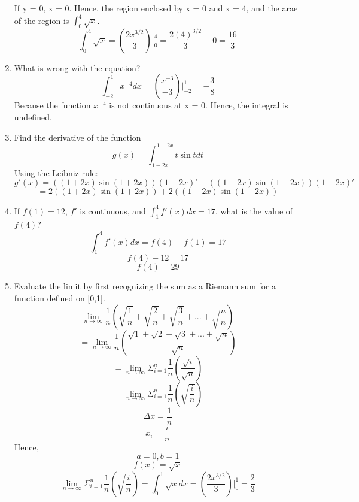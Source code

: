 \documentclass[12pt]{article}
\begin{document}
\begin{enumerate}
\begin{center}
    \end{center}
    If y = 0, x = 0. Hence, the region enclosed by x = 0 and x = 4, and the arae of the region is $\int_{0}^{4} \sqrt{x}$.
    \[\int_{0}^{4} \sqrt{x} = (\frac{2x^{3/2}}{3})|^{4}_{0} = \frac{2(4)^{3/2}}{3} - 0 = \frac{16}{3}\]
\setcounter{enumi}{54}
    \item What is wrong with the equation?
    \[\int_{-2}^{1} x^{-4}dx = (\frac{x^{-3}}{-3})|^{1}_{-2} = -\frac{3}{8} \]
    Because the function $x^{-4}$ is not continuous at x = 0. Hence, the integral is undefined.
\setcounter{enumi}{59}
    \item Find the derivative of the function
    \[g(x) = \int_{1-2x}^{1+2x} t \sin t dt\]
    Using the Leibniz rule:
    \[g'(x) = ((1+2x)\sin (1+2x))(1+2x)' - ((1-2x)\sin (1-2x))(1-2x)' \]
    \[ = 2((1+2x)\sin (1+2x)) + 2((1-2x)\sin (1-2x)) \]
\setcounter{enumi}{66}
    \item If $f(1) = 12$, $f'$ is continuous, and $\int_{1}^{4} f'(x)dx = 17$, what is the value of $f(4)$?
    \[\int_{1}^{4} f'(x)dx = f(4) - f(1) = 17\]
    \[f(4) - 12 = 17\]
    \[f(4) = 29\]
\setcounter{enumi}{73}
    \item Evaluate the limit by first recognizing the sum as a Riemann sum for a function defined on [0,1].
    \[\lim_{n \to \infty} \frac{1}{n} (\sqrt{\frac{1}{n}} + \sqrt{\frac{2}{n}} + \sqrt{\frac{3}{n}} + ... + \sqrt{\frac{n}{n}})\]
    \[ = \lim_{n \to \infty} \frac{1}{n} (\frac{\sqrt{1} + \sqrt{2} + \sqrt{3} + ... + \sqrt{n}}{\sqrt{n}})\]
    \[ = \lim_{n \to \infty} \Sigma^{n}_{i = 1} \frac{1}{n} (\frac{\sqrt{i}}{\sqrt{n}})\]
    \[ = \lim_{n \to \infty} \Sigma^{n}_{i = 1} \frac{1}{n} (\sqrt{\frac{i}{n}})\]
    \[\Delta x = \frac{1}{n}\]
    \[x_i = \frac{i}{n}\]
    Hence,
    \[a = 0, b = 1\]
    \[f(x) = \sqrt{x}\]
    \[\lim_{n \to \infty} \Sigma^{n}_{i = 1} \frac{1}{n} (\sqrt{\frac{i}{n}}) = \int_{0}^{1} \sqrt{x} dx = (\frac{2x^{3/2}}{3})|_{0}^{1} = \frac{2}{3}\]
\end{enumerate}
\end{document}
